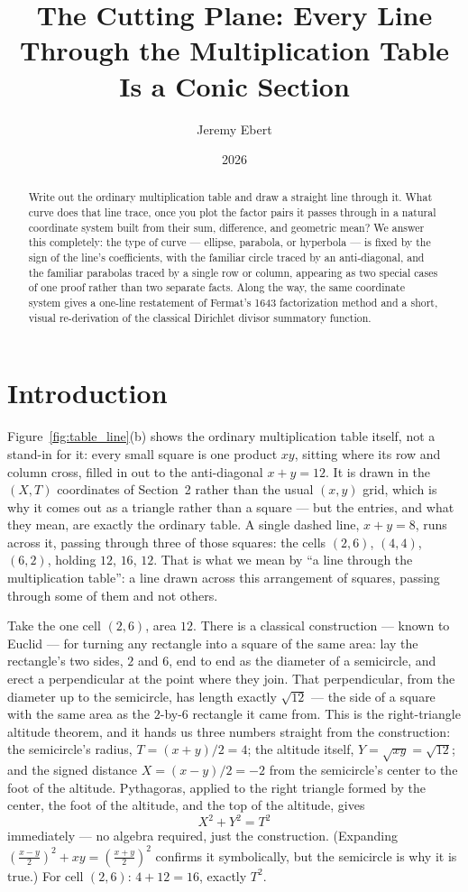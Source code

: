 \documentclass[11pt]{amsart}
\title{The Cutting Plane: Every Line Through the Multiplication Table Is a Conic Section}
\author{Jeremy Ebert}
\date{2026}
\theoremstyle{remark}
\begin{document}
\maketitle

\begin{abstract}
Write out the ordinary multiplication table and draw a straight line through it. What curve does that line trace, once you plot the factor pairs it passes through in a natural coordinate system built from their sum, difference, and geometric mean? We answer this completely: the type of curve --- ellipse, parabola, or hyperbola --- is fixed by the sign of the line's coefficients, with the familiar circle traced by an anti-diagonal, and the familiar parabolas traced by a single row or column, appearing as two special cases of one proof rather than two separate facts. Along the way, the same coordinate system gives a one-line restatement of Fermat's 1643 factorization method and a short, visual re-derivation of the classical Dirichlet divisor summatory function.
\end{abstract}

\section{Introduction}

Figure~\ref{fig:table_line}(b) shows the ordinary multiplication table itself, not a stand-in for it: every small square is one product $xy$, sitting where its row and column cross, filled in out to the anti-diagonal $x+y=12$. It is drawn in the $(X,T)$ coordinates of Section~2 rather than the usual $(x,y)$ grid, which is why it comes out as a triangle rather than a square --- but the entries, and what they mean, are exactly the ordinary table. A single dashed line, $x+y=8$, runs across it, passing through three of those squares: the cells $(2,6)$, $(4,4)$, $(6,2)$, holding $12$, $16$, $12$. That is what we mean by ``a line through the multiplication table'': a line drawn across this arrangement of squares, passing through some of them and not others.

Take the one cell $(2,6)$, area $12$. There is a classical construction --- known to Euclid --- for turning any rectangle into a square of the same area: lay the rectangle's two sides, $2$ and $6$, end to end as the diameter of a semicircle, and erect a perpendicular at the point where they join. That perpendicular, from the diameter up to the semicircle, has length exactly $\sqrt{12}$ --- the side of a square with the same area as the $2$-by-$6$ rectangle it came from. This is the right-triangle altitude theorem, and it hands us three numbers straight from the construction: the semicircle's radius, $T=(x+y)/2=4$; the altitude itself, $Y=\sqrt{xy}=\sqrt{12}$; and the signed distance $X=(x-y)/2=-2$ from the semicircle's center to the foot of the altitude. Pythagoras, applied to the right triangle formed by the center, the foot of the altitude, and the top of the altitude, gives
\[
X^2+Y^2=T^2
\]
immediately --- no algebra required, just the construction. (Expanding $\left(\frac{x-y}2\right)^2+xy=\left(\frac{x+y}2\right)^2$ confirms it symbolically, but the semicircle is why it is true.) For cell $(2,6)$: $4+12=16$, exactly $T^2$.
\end{document}
